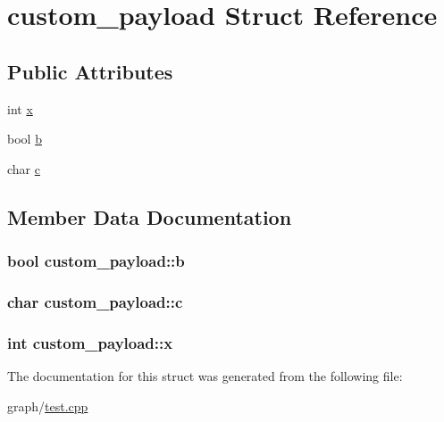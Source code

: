 \hypertarget{structcustom__payload}{}\section{custom\+\_\+payload Struct Reference}
\label{structcustom__payload}
\subsection*{Public Attributes}
\begin{DoxyCompactItemize}
\item 
int \hyperlink{structcustom__payload_a2527a056a4b66c7b0c6f9a0cd0546a6c}{x}
\item 
bool \hyperlink{structcustom__payload_a104eee3e4326b7f14a17f00ffcf1c7c3}{b}
\item 
char \hyperlink{structcustom__payload_aa67786ca96fefbdd104b1e8fcb2dd754}{c}
\end{DoxyCompactItemize}


\subsection{Member Data Documentation}
\subsubsection[{\texorpdfstring{b}{b}}]{\setlength{\rightskip}{0pt plus 5cm}bool custom\+\_\+payload\+::b}\hypertarget{structcustom__payload_a104eee3e4326b7f14a17f00ffcf1c7c3}{}\label{structcustom__payload_a104eee3e4326b7f14a17f00ffcf1c7c3}
\subsubsection[{\texorpdfstring{c}{c}}]{\setlength{\rightskip}{0pt plus 5cm}char custom\+\_\+payload\+::c}\hypertarget{structcustom__payload_aa67786ca96fefbdd104b1e8fcb2dd754}{}\label{structcustom__payload_aa67786ca96fefbdd104b1e8fcb2dd754}
\subsubsection[{\texorpdfstring{x}{x}}]{\setlength{\rightskip}{0pt plus 5cm}int custom\+\_\+payload\+::x}\hypertarget{structcustom__payload_a2527a056a4b66c7b0c6f9a0cd0546a6c}{}\label{structcustom__payload_a2527a056a4b66c7b0c6f9a0cd0546a6c}


The documentation for this struct was generated from the following file\+:\begin{DoxyCompactItemize}
\item 
graph/\hyperlink{test_8cpp}{test.\+cpp}\end{DoxyCompactItemize}
